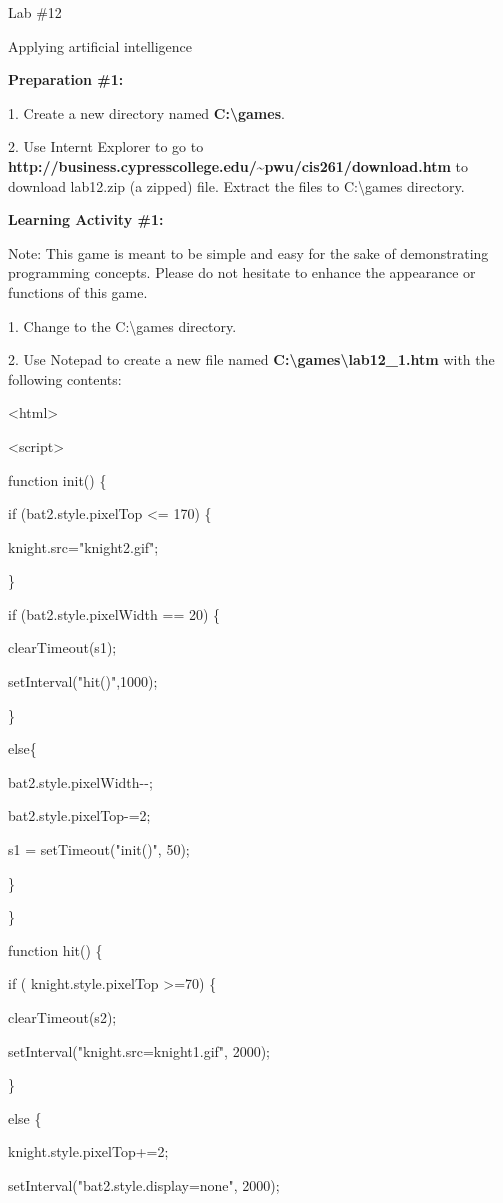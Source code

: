 \documentclass[
]{article}
\begin{document}
Lab \#12

Applying artificial intelligence

\textbf{Preparation \#1:}

1. Create a new directory named \textbf{C:\textbackslash games}.

2. Use Internt Explorer to go to
\textbf{http://business.cypresscollege.edu/\textasciitilde pwu/cis261/download.htm}
to download lab12.zip (a zipped) file. Extract the files to
C:\textbackslash games directory.

\textbf{Learning Activity \#1:}

Note: This game is meant to be simple and easy for the sake of
demonstrating programming concepts. Please do not hesitate to enhance
the appearance or functions of this game.

1. Change to the C:\textbackslash games directory.

2. Use Notepad to create a new file named
\textbf{C:\textbackslash games\textbackslash lab12\_1.htm} with the
following contents:

\textless html\textgreater{}

\textless script\textgreater{}

function init() \{

if (bat2.style.pixelTop \textless= 170) \{

knight.src="knight2.gif";

\}

if (bat2.style.pixelWidth == 20) \{

clearTimeout(s1);

setInterval("hit()",1000);

\}

else\{

bat2.style.pixelWidth-\/-;

bat2.style.pixelTop-=2;

s1 = setTimeout("init()", 50);

\}

\}

function hit() \{

if ( knight.style.pixelTop \textgreater=70) \{

clearTimeout(s2);

setInterval("knight.src=\textquotesingle knight1.gif\textquotesingle",
2000);

\}

else \{

knight.style.pixelTop+=2;

setInterval("bat2.style.display=\textquotesingle none\textquotesingle",
2000);
\end{document}
